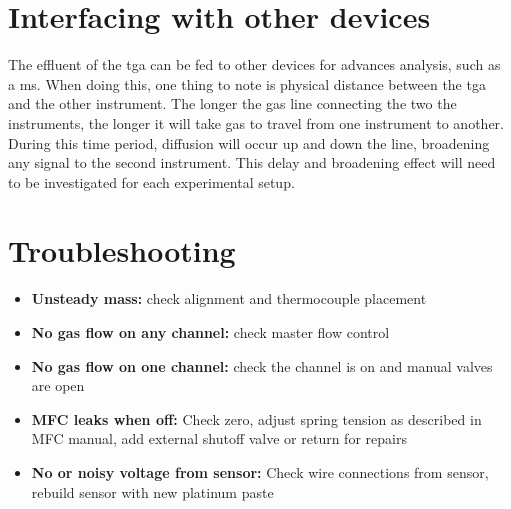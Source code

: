 \section{Interfacing with other devices}
    The effluent of the \gls{tga} can be fed to other devices for advances analysis, such as a \gls{ms}.
    When doing this, one thing to note is physical distance between the \gls{tga} and the other instrument.
    The longer the gas line connecting the two the instruments, the longer it will take gas to travel from one instrument to another.
    During this time period, diffusion will occur up and down the line, broadening any signal to the second instrument.
    This delay and broadening effect will need to be investigated for each experimental setup.

\section{Troubleshooting}
    \begin{itemize}
      \item \textbf{Unsteady mass:} check alignment and thermocouple placement
      \item \textbf{No gas flow on any channel:} check master flow control
      \item \textbf{No gas flow on one channel:} check the channel is on and manual valves are open
      \item \textbf{MFC leaks when off:} Check zero, adjust spring tension as described in MFC manual, add external shutoff valve or return for repairs
      \item \textbf{No or noisy voltage from  sensor:} Check wire connections from sensor, rebuild sensor with new platinum paste
    \end{itemize}
